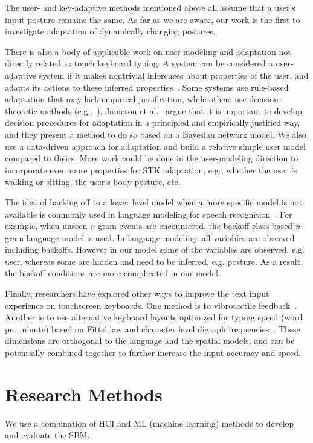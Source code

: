 \documentclass{sigchi}
\begin{document}
The user- and key-adaptive methods mentioned above all assume that a user's input posture
remains the same. As far as we are aware, our work is the first to investigate adaptation of dynamically changing postures.

There is also a body of applicable work on user modeling and adaptation not
directly related to touch keyboard typing. A system can be considered a
user-adaptive system if it makes
nontrivial inferences about properties of the user, and adapts its actions
to these inferred properties~\cite{Jameson:2000}. Some systems use rule-based
adaptation that may lack empirical justification, while others use 
decision-theoretic methods (e.g.,~\cite{Jameson:1998}). Jameson et al.~\cite{Jameson:2000} argue that it is important to develop decision procedures for adaptation in a principled and
empirically justified way, and they present a method to do so based on a
Bayesian network model. We also use a data-driven approach for adaptation and build a relative simple user model compared to theirs. More work could be done in the
user-modeling direction to incorporate even more properties for
STK adaptation, e.g., whether the user is walking or sitting, the user's body
posture, etc.

The idea of backing off to a lower level model when a more specific 
model is not available is commonly used in language modeling for speech 
recognition~\cite{Katz:1987, Zitouni:2007}. For example, when unseen 
\textit{n}\mbox{-}gram events are encountered, the backoff class-based \textit{n}\mbox{-}gram 
language model is used.  In language modeling, all variables are observed including backoffs. 
However in our model some of the variables are observed, e.g. user, whereas some
are hidden and need to be inferred, e.g. posture. As a result, the backoff 
conditions are more complicated in our model.

Finally, researchers have explored other ways to improve the 
text input experience on touchscreen keyboards. One method is to vibrotactile feedback~\cite{Brewster:2007, Hoggan:2008}. 
Another is to use alternative keyboard layouts optimized for typing speed (word per minute)
based on Fitts' law and character level digraph frequencies~\cite{Zhai:2000, MacKenzie:1999}.
These dimensions are orthogonal to the language and the spatial models, and can be potentially 
combined together to further increase the input accuracy and speed.

\section{Research Methods}
We use a combination of HCI and ML (machine learning) methods to develop and evaluate the SBM.
\end{document}

